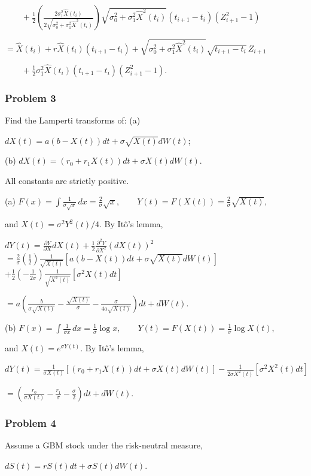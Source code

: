 $\qquad+\frac12\left(\frac{2\sigma_1^2\widehat X(t_i)}{2\sqrt{\sigma_0^2+\sigma_1^2\widehat X^2(t_i)}}\right)\sqrt{\sigma_0^2+\sigma_1^2\widehat X^2(t_i)}(t_{i+1}-t_i)(Z_{i+1}^2-1)$

$=\widehat X(t_i)+r\widehat X(t_i)(t_{i+1}-t_i)+\sqrt{\sigma_0^2+\sigma_1^2\widehat X^2(t_i)}\sqrt{t_{i+1}-t_i}\,Z_{i+1}$

$\qquad+\frac12\sigma_1^2\widehat X(t_i)(t_{i+1}-t_i)(Z_{i+1}^2-1)$.

\subsubsection*{Problem 3}

 Find the Lamperti transforms of: (a)

$dX(t)=a(b-X(t))dt+\sigma\sqrt{X(t)}dW(t)$;

(b)
$dX(t)=(r_0+r_1X(t))dt+\sigma X(t)dW(t)$.

All constants are strictly positive.

 (a)
$F(x)=\int\frac1{\sigma\sqrt x}\,dx=\frac2\sigma\sqrt x,\qquad Y(t)=F(X(t))=\frac2\sigma\sqrt{X(t)},$

and $X(t)=\sigma^2Y^2(t)/4$. By It\^o's lemma,

$dY(t)=\frac{\partial Y}{\partial X}dX(t)+\frac12\frac{\partial^2Y}{\partial X^2}(dX(t))^2$
$=\frac2\sigma\left(\frac12\right)\frac1{\sqrt{X(t)}}[a(b-X(t))dt+\sigma\sqrt{X(t)}dW(t)]$
$+\frac12\left(-\frac1{2\sigma}\right)\frac1{\sqrt{X^3(t)}}[\sigma^2X(t)dt]$

$=a\left(\frac{b}{\sigma\sqrt{X(t)}}-\frac{\sqrt{X(t)}}\sigma-\frac\sigma{4a\sqrt{X(t)}}\right)dt+dW(t)$.

(b)
$F(x)=\int\frac1{\sigma x}\,dx=\frac1\sigma\log x,\qquad Y(t)=F(X(t))=\frac1\sigma\log X(t),$

and $X(t)=e^{\sigma Y(t)}$. By It\^o's lemma,

$dY(t)=\frac1{\sigma X(t)}[(r_0+r_1X(t))dt+\sigma X(t)dW(t)]-\frac1{2\sigma X^2(t)}[\sigma^2X^2(t)dt]$

$=\left(\frac{r_0}{\sigma X(t)}-\frac{r_1}\sigma-\frac\sigma2\right)dt+dW(t)$.

\subsubsection*{Problem 4}

 Assume a GBM stock under the risk-neutral measure,

$dS(t)=rS(t)dt+\sigma S(t)dW(t)$.


